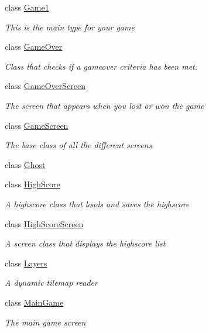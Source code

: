 \begin{DoxyCompactItemize}
class \hyperlink{class_pacman_1_1_game1}{Game1}
\begin{DoxyCompactList}\small\item\em This is the main type for your game \end{DoxyCompactList}\item 
class \hyperlink{class_pacman_1_1_game_over}{Game\-Over}
\begin{DoxyCompactList}\small\item\em Class that checks if a gameover criteria has been met. \end{DoxyCompactList}\item 
class \hyperlink{class_pacman_1_1_game_over_screen}{Game\-Over\-Screen}
\begin{DoxyCompactList}\small\item\em The screen that appears when you lost or won the game \end{DoxyCompactList}\item 
class \hyperlink{class_pacman_1_1_game_screen}{Game\-Screen}
\begin{DoxyCompactList}\small\item\em The base class of all the different screens \end{DoxyCompactList}\item 
class \hyperlink{class_pacman_1_1_ghost}{Ghost}
\item 
class \hyperlink{class_pacman_1_1_high_score}{High\-Score}
\begin{DoxyCompactList}\small\item\em A highscore class that loads and saves the highscore \end{DoxyCompactList}\item 
class \hyperlink{class_pacman_1_1_high_score_screen}{High\-Score\-Screen}
\begin{DoxyCompactList}\small\item\em A screen class that displays the highscore list \end{DoxyCompactList}\item 
class \hyperlink{class_pacman_1_1_layers}{Layers}
\begin{DoxyCompactList}\small\item\em A dynamic tilemap reader \end{DoxyCompactList}\item 
class \hyperlink{class_pacman_1_1_main_game}{Main\-Game}
\begin{DoxyCompactList}\small\item\em The main game screen \end{DoxyCompactList}\item 

\end{DoxyCompactItemize}
